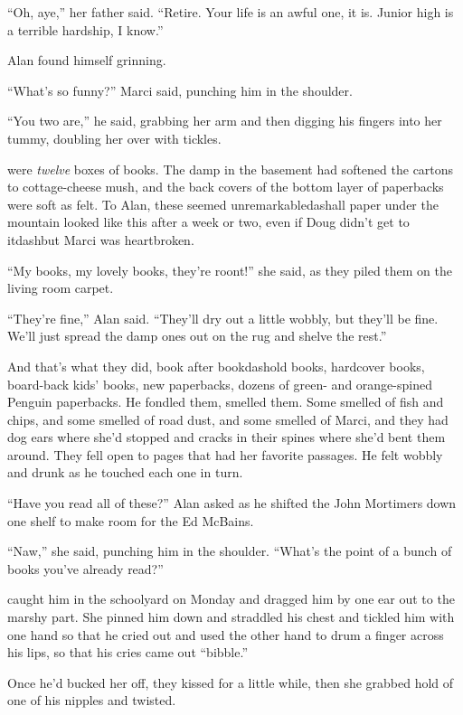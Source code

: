 ``Oh, aye,'' her father said.  ``Retire.  Your life is an awful one,
it is.  Junior high is a terrible hardship, I know.''

Alan found himself grinning.

``What's so funny?'' Marci said, punching him in the shoulder.

``You two are,'' he said, grabbing her arm and then digging his
fingers into her tummy, doubling her over with tickles.

 were \textit{twelve} boxes of books.  The damp in the basement
had softened the cartons to cottage-cheese mush, and the back covers
of the bottom layer of paperbacks were soft as felt.  To Alan, these
seemed unremarkabledash{}all paper under the mountain looked like this
after a week or two, even if Doug didn't get to itdash{}but Marci was
heartbroken.

``My books, my lovely books, they're roont!'' she said, as they piled
them on the living room carpet.

``They're fine,'' Alan said.  ``They'll dry out a little wobbly, but
they'll be fine.  We'll just spread the damp ones out on the rug and
shelve the rest.''

And that's what they did, book after bookdash{}old books, hardcover
books, board-back kids' books, new paperbacks, dozens of green- and
orange-spined Penguin paperbacks.  He fondled them, smelled them. 
Some smelled of fish and chips, and some smelled of road dust, and
some smelled of Marci, and they had dog ears where she'd stopped and
cracks in their spines where she'd bent them around.  They fell open
to pages that had her favorite passages.  He felt wobbly and drunk as
he touched each one in turn.

``Have you read all of these?'' Alan asked as he shifted the John
Mortimers down one shelf to make room for the Ed McBains.

``Naw,'' she said, punching him in the shoulder.  ``What's the point
of a bunch of books you've already read?''

 caught him in the schoolyard on Monday and dragged him by one ear
out to the marshy part.  She pinned him down and straddled his chest
and tickled him with one hand so that he cried out and used the other
hand to drum a finger across his lips, so that his cries came out
``bibble.''

Once he'd bucked her off, they kissed for a little while, then she
grabbed hold of one of his nipples and twisted.

